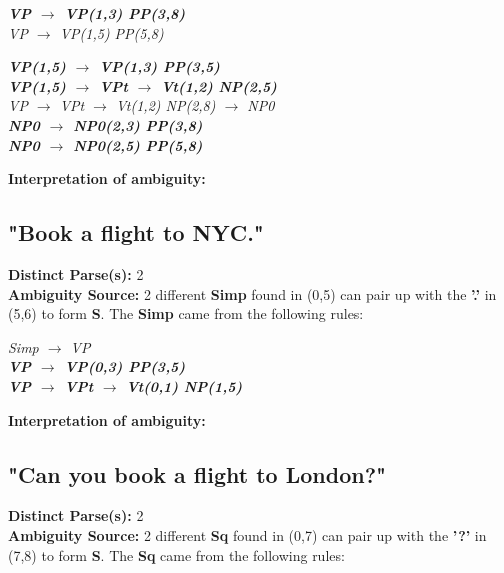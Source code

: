 \documentclass{article}
\begin{document}
\begin{center}
	\textbf{\emph{VP $\rightarrow$ VP(1,3) PP(3,8)}}\\
	
	\emph{VP $\rightarrow$ VP(1,5) PP(5,8)}
	
	\textbf{\emph{VP(1,5) $\rightarrow$ VP(1,3) PP(3,5)}\\
	\emph{VP(1,5) $\rightarrow$ VPt $\rightarrow$ Vt(1,2) NP(2,5)}}\\

	\emph{VP $\rightarrow$ VPt $\rightarrow$ Vt(1,2) NP(2,8) $\rightarrow$ NP0}\\
	\textbf{\emph{NP0 $\rightarrow$ NP0(2,3) PP(3,8)}\\
	\emph{NP0 $\rightarrow$ NP0(2,5) PP(5,8)}}
\end{center}

\textbf{Interpretation of ambiguity:}\\

\subsection{"Book a flight to NYC."}

\textbf{Distinct Parse(s):} 2\\

\textbf{Ambiguity Source:} 2 different \textbf{Simp} found in (0,5) can pair up with the \textbf{'.'} in (5,6) to form \textbf{S}. The \textbf{Simp} came from the following rules:

\begin{center}
	\emph{Simp $\rightarrow$ VP}\\
	\textbf{\emph{VP $\rightarrow$ VP(0,3) PP(3,5)}\\
	\emph{VP $\rightarrow$ VPt $\rightarrow$ Vt(0,1) NP(1,5)}}
\end{center}

\textbf{Interpretation of ambiguity:}\\

\subsection{"Can you book a flight to London?"}

\textbf{Distinct Parse(s):} 2\\

\textbf{Ambiguity Source:} 2 different \textbf{Sq} found in (0,7) can pair up with the \textbf{'?'} in (7,8) to form \textbf{S}. The \textbf{Sq} came from the following rules:
\end{document}
